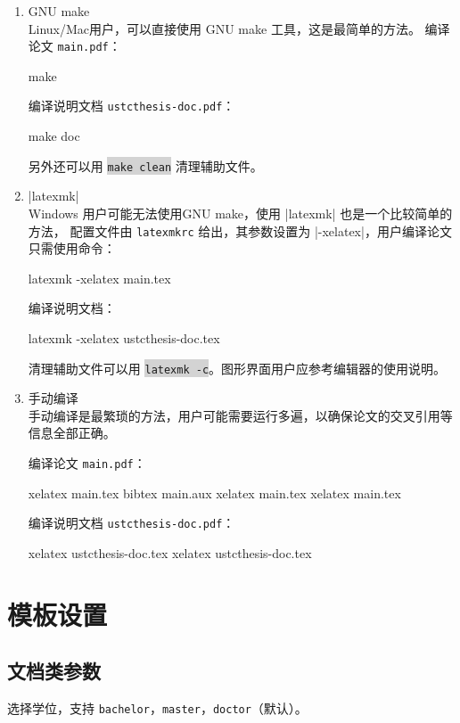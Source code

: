 \documentclass[a4paper]{ltxdoc}
\makeatletter
\DeclareRobustCommand\file{\nolinkurl}
\DeclareRobustCommand\opt{\texttt}
\def\DescribeOption{\leavevmode\@bsphack\begingroup\MakePrivateLetters
  \Describe@Option}
\def\Describe@Option#1{\endgroup
              \marginpar{\raggedleft\PrintDescribeOption{#1}}%
              \SpecialEnvIndex{#1}\@esphack\ignorespaces}
\newcommand\shellcmd[1]{\colorbox{lightgray}{\lstinline[style=lstshell]|#1|}}
\makeatother
\begin{document}
\begin{enumerate}

\item GNU make \\
Linux/Mac用户，可以直接使用 GNU make 工具，这是最简单的方法。
编译论文 \file{main.pdf}：
\begin{shell}
  make
\end{shell}
编译说明文档 \file{ustcthesis-doc.pdf}：
\begin{shell}
  make doc
\end{shell}
另外还可以用 \shellcmd{make clean} 清理辅助文件。

\item |latexmk| \\
Windows 用户可能无法使用GNU make，使用 |latexmk| 也是一个比较简单的方法，
配置文件由 \file{latexmkrc} 给出，其参数设置为 |-xelatex|，用户编译论文
只需使用命令：
\begin{shell}
  latexmk -xelatex main.tex
\end{shell}
编译说明文档：
\begin{shell}
  latexmk -xelatex ustcthesis-doc.tex
\end{shell}
清理辅助文件可以用 \shellcmd{latexmk -c}。图形界面用户应参考编辑器的使用说明。

\item 手动编译 \\
手动编译是最繁琐的方法，用户可能需要运行多遍，以确保论文的交叉引用等信息全部正确。

编译论文 \file{main.pdf}：
\begin{shell}
  xelatex main.tex
  bibtex main.aux
  xelatex main.tex
  xelatex main.tex
\end{shell}
编译说明文档 \file{ustcthesis-doc.pdf}：
\begin{shell}
  xelatex ustcthesis-doc.tex
  xelatex ustcthesis-doc.tex
\end{shell}
\end{enumerate}



\section{模板设置}


\subsection{文档类参数}
\DescribeOption{degree}
选择学位，支持 \opt{bachelor}，\opt{master}，\opt{doctor}（默认）。
\end{document}
